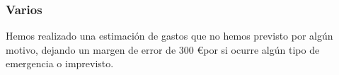 \subsubsection{Varios}

Hemos realizado una estimación de gastos que no hemos previsto por algún motivo, dejando un margen de error de 300 \euro por si ocurre algún tipo de emergencia o imprevisto.

\newpage


       
